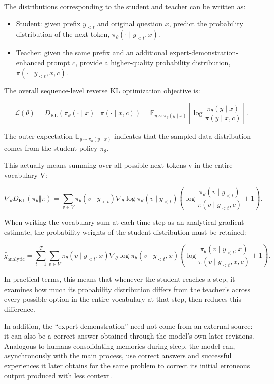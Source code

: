 The distributions corresponding to the student and teacher can be written as:

\begin{itemize}
\tightlist
\item
  Student: given prefix \(y_{<t}\) and original question \(x\), predict the probability distribution of the next token, \(\pi_\theta(\cdot \mid y_{<t}, x)\).
\item
  Teacher: given the same prefix and an additional expert-demonstration-enhanced prompt \(c\), provide a higher-quality probability distribution, \(\pi(\cdot \mid y_{<t}, x, c)\).
\end{itemize}

The overall sequence-level reverse KL optimization objective is:

\[
\mathcal{L}(\theta)
= D_{\mathrm{KL}}\left(\pi_\theta(\cdot \mid x)\,\Vert\,\pi(\cdot \mid x,c)\right)
= \mathbb{E}_{y\sim \pi_\theta(y\mid x)}
\left[
\log\frac{\pi_\theta(y\mid x)}{\pi(y\mid x,c)}
\right].
\]

The outer expectation \(\mathbb{E}_{y\sim \pi_\theta(y\mid x)}\) indicates that the sampled data distribution comes from the student policy \(\pi_\theta\).

This actually means summing over all possible next tokens v in the entire vocabulary V:

\[
\nabla_\theta D_{\mathrm{KL}}(\pi_\theta\Vert\pi)
=
\sum_{v\in V}
\pi_\theta(v\mid y_{<t})
\nabla_\theta \log \pi_\theta(v\mid y_{<t})
\left(
\log\frac{\pi_\theta(v\mid y_{<t})}{\pi(v\mid y_{<t},c)}
+ 1
\right).
\]

When writing the vocabulary sum at each time step as an analytical gradient estimate, the probability weights of the student distribution must be retained:

\[
\hat{g}_{\mathrm{analytic}}
=
\sum_{t=1}^{T}\sum_{v\in V}
\pi_\theta(v\mid y_{<t},x)
\nabla_\theta \log \pi_\theta(v\mid y_{<t},x)
\left(
\log\frac{\pi_\theta(v\mid y_{<t},x)}{\pi(v\mid y_{<t},x,c)}
+1
\right).
\]

In practical terms, this means that whenever the student reaches a step, it examines how much its probability distribution differs from the teacher's across every possible option in the entire vocabulary at that step, then reduces this difference.

In addition, the ``expert demonstration'' need not come from an external source: it can also be a correct answer obtained through the model's own later revisions. Analogous to humans consolidating memories during sleep, the model can, asynchronously with the main process, use correct answers and successful experiences it later obtains for the same problem to correct its initial erroneous output produced with less context.

